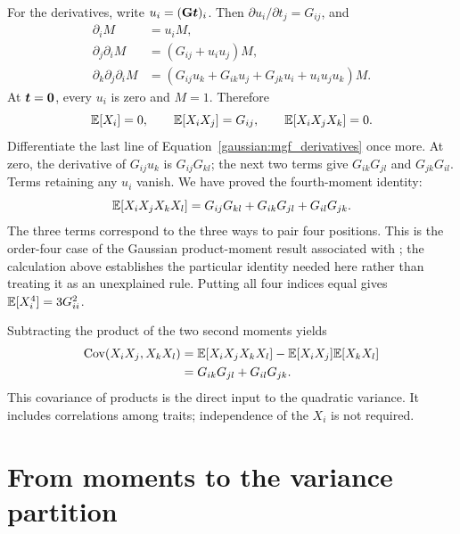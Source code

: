 For the derivatives, write $u_i=(\mathbf{G}\boldsymbol{t})_i$. Then
$\partial u_i/\partial t_j=G_{ij}$, and
\begin{align}
\partial_i M&=u_iM,\nonumber\\
\partial_j\partial_i M&=(G_{ij}+u_i u_j)M,\nonumber\\
\partial_k\partial_j\partial_i M
 &=(G_{ij}u_k+G_{ik}u_j+G_{jk}u_i+u_i u_j u_k)M.
\label{gaussian:mgf_derivatives}
\end{align}
At $\boldsymbol{t}=\boldsymbol{0}$, every $u_i$ is zero and $M=1$. Therefore
\begin{equation}
\mathbb E[X_i]=0,
\qquad \mathbb E[X_iX_j]=G_{ij},
\qquad \mathbb E[X_iX_jX_k]=0.
\end{equation}
Differentiate the last line of Equation~\eqref{gaussian:mgf_derivatives}
once more. At zero, the derivative of $G_{ij}u_k$ is $G_{ij}G_{kl}$;
the next two terms give $G_{ik}G_{jl}$ and $G_{jk}G_{il}$. Terms retaining
any $u_i$ vanish. We have proved the fourth-moment identity:
\begin{equation}
\mathbb E[X_iX_jX_kX_l]
 =G_{ij}G_{kl}+G_{ik}G_{jl}+G_{il}G_{jk}.
\label{gaussian:fourth_moment}
\end{equation}
The three terms correspond to the three ways to pair four positions. This
is the order-four case of the Gaussian product-moment result associated
with \citet{Isserlis1918}; the calculation above establishes the particular
identity needed here rather than treating it as an unexplained rule.
Putting all four indices equal gives $\mathbb E[X_i^4]=3G_{ii}^2$.

Subtracting the product of the two second moments yields
\begin{align}
\operatorname{Cov}(X_iX_j,X_kX_l)
 &=\mathbb E[X_iX_jX_kX_l]-\mathbb E[X_iX_j]\mathbb E[X_kX_l]\nonumber\\
 &=G_{ik}G_{jl}+G_{il}G_{jk}.
\label{gaussian:product_covariance}
\end{align}
This covariance of products is the direct input to the quadratic variance.
It includes correlations among traits; independence of the $X_i$ is not
required.

\section{From moments to the variance partition}
\label{gaussian:variance_derivation}

